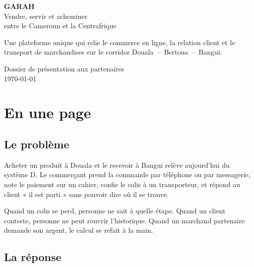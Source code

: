 \documentclass[11pt,a4paper]{article}
\begin{document}
\begin{titlepage}
\centering
\vspace*{3cm}

{\Huge\bfseries\color{marque} GARAH}\\[0.6em]
{\Large\color{encre} Vendre, servir et acheminer}\\[0.3em]
{\Large\color{encre} entre le Cameroun et la Centrafrique}\\[3cm]

\begin{minipage}{0.8\textwidth}
\centering\large\color{gris}
Une plateforme unique qui relie le commerce en ligne,
la relation client et le transport de marchandises
sur le corridor Douala~--~Bertoua~--~Bangui.
\end{minipage}

\vfill
{\color{gris}Dossier de présentation aux partenaires \\[0.3em]
\today}
\end{titlepage}

\tableofcontents
\newpage

\section{En une page}

\subsection*{Le problème}

Acheter un produit à Douala et le recevoir à Bangui relève aujourd'hui du
système D. Le commerçant prend la commande par téléphone ou par messagerie,
note le paiement sur un cahier, confie le colis à un transporteur, et
répond au client « il est parti » sans pouvoir dire où il se trouve.

Quand un colis se perd, personne ne sait à quelle étape. Quand un client
conteste, personne ne peut rouvrir l'historique. Quand un marchand partenaire
demande son argent, le calcul se refait à la main.

\subsection*{La réponse}
\end{document}
